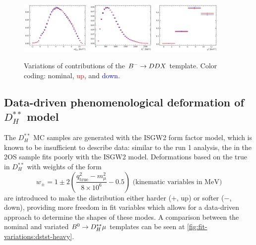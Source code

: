 \begin{figure}[!htb]
    \centering
    \includegraphics[width=0.3\textwidth]{./figs-fit-fit-variations/histo-var/D0_iso_uDDMu__vs__D0_iso_uDDMu_kst_m__vs__D0_iso_uDDMu_kst_p__m2miss.pdf}
    \includegraphics[width=0.3\textwidth]{./figs-fit-fit-variations/histo-var/D0_iso_uDDMu__vs__D0_iso_uDDMu_kst_m__vs__D0_iso_uDDMu_kst_p__el.pdf}
    \includegraphics[width=0.3\textwidth]{./figs-fit-fit-variations/histo-var/D0_iso_uDDMu__vs__D0_iso_uDDMu_kst_m__vs__D0_iso_uDDMu_kst_p__q2.pdf}

    \caption{
        Variations of \Kstar contributions of the
        ${{{B}^-}} \rightarrow DDX$ template.
        Color coding: nominal, \textcolor{red}{up}, and \textcolor{blue}{down}.
    }
    \label{fig:fit-variations:ddx-kst}
\end{figure}


\subsection{Data-driven phenomenological deformation of $D_H^{**}$ model}

The $D_H^{**}$ MC samples are generated with the ISGW2 form factor model,
which is known to be insufficient to describe data:
similar to the run 1 analysis,
the \qSq in the 2OS sample fits poorly with the ISGW2 model.
Deformations based on the true \qSq
in $D_H^{**}$ with weights of the form
\begin{equation}
    w_\pm = 1 \pm 2 \left(
            \frac{q^2_\text{true} - m^2_\mu}{8 \times 10^6} - 0.5
        \right) \text{ (kinematic variables in MeV)}
\end{equation}
are introduced to make the \qSq distribution either harder ($+$, up) or
softer ($-$, down),
providing more freedom in fit variables
which allows for a data-driven approach to determine the shapes of these modes.
A comparison between the nominal and variated
${{B}^0} \rightarrow D_H^{**}\mu$ templates can be seen at
\cref{fig:fit-variations:dstst-heavy}.

